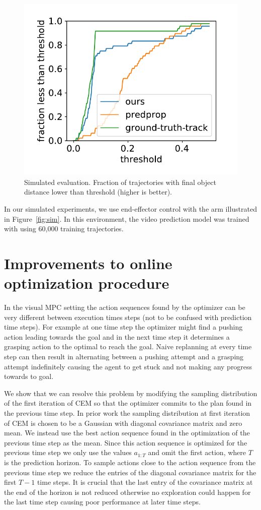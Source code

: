 \begin{figure}
	\centering
	\includegraphics[width=0.4\columnwidth]{images/2obj_scores_ours-predprop-ground-truth-track.pdf}
	\caption{\small{Simulated evaluation. Fraction of trajectories with final object distance lower than threshold (higher is better).}}
	\label{fig:sim_bench}
\end{figure}

In our simulated experiments, we use end-effector control with the arm illustrated in Figure~\ref{fig:sim}. In this environment, the video prediction model was trained with using 60,000 training trajectories.


\section*{Improvements to online optimization procedure}
In the visual MPC setting the action sequences found by the optimizer can be very different between execution times steps (not to be confused with prediction time steps). For example at one time step the optimizer might find a pushing action leading towards the goal and in the next time step it determines a grasping action to the optimal to reach the goal. Naive replanning at every time step can then result in alternating between a pushing attempt and a grasping attempt indefinitely causing the agent to get stuck and not making any progress towards to goal. 

We show that we can resolve this problem by modifying the sampling distribution of the first iteration of CEM so that the optimizer commits to the plan found in the previous time step. In prior work \cite{sna} the sampling distribution at first iteration of CEM is chosen to be a Gaussian with diagonal covariance matrix and zero mean. We instead use the best action sequence found in the optimization of the previous time step as the mean. Since this action sequence is optimized for the previous time step we only use the values $a_{1:T}$ and omit the first action, where $T$ is the prediction horizon. To sample actions close to the action sequence from the previous time step we reduce the entries of the diagonal covariance matrix for the first $T-1$ time steps. It is crucial that the last entry of the covariance matrix at the end of the horizon is not reduced otherwise no exploration could happen for the last time step causing poor performance at later time steps.
